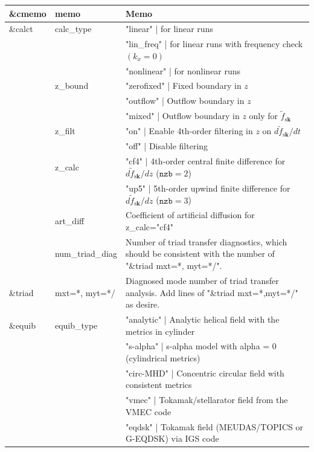 \begin{longtable}{ l | l | p{10cm} }
  \&cmemo & memo & Memo\\
  \hline
  \&calct & calc\_type & "linear" | for linear runs\\
           ~ &             ~ & "lin\_freq" | for linear runs with frequency check $(k_x = 0)$\\
           ~ &             ~ & "nonlinear" | for nonlinear runs\\
             \cline{2-3}
           ~ & z\_bound & "zerofixed" | Fixed boundary in $z$\\
           ~ &            ~ & "outflow" | Outflow boundary in $z$\\
           ~ &            ~ & "mixed" | Outflow boundary in $z$ only for $\tilde{f}_{\mathrm{s}\bm{k}}$\\
             \cline{2-3}
           ~ & z\_filt & "on" | Enable 4th-order filtering in $z$ on $d\tilde{f}_{\mathrm{s}\bm{k}}/dt$\\
           ~ &       ~ & "off" | Disable filtering\\
             \cline{2-3}
           ~ & z\_calc & "cf4" | 4th-order central finite difference for $d\tilde{f}_{\mathrm{s}\bm{k}}/dz$ ($\texttt{nzb}=2$)\\
           ~ &         ~ & "up5" | 5th-order upwind finite difference for $d\tilde{f}_{\mathrm{s}\bm{k}}/dz$ ($\texttt{nzb}=3$)\\
             \cline{2-3}
           ~ & art\_diff & Coefficient of artificial diffusion for z\_calc="cf4"\\
             \cline{2-3}
           ~ & num\_triad\_diag & Number of triad transfer diagnostics, which should be consistent
                                           with the number of "\&triad mxt=*, myt=*/".\\
  \hline
  \&triad & mxt=*, myt=*/ & Diagnosed mode number of triad transfer analysis. Add lines of "\&triad mxt=*,myt=*/" as desire.\\
  \hline
  \&equib & equib\_type & "analytic" | Analytic helical field with the metrics in cylinder\\
           ~ &               ~ & "s-alpha" | s-alpha model with alpha = 0 (cylindrical metrics)\\
           ~ &               ~ & "circ-MHD" | Concentric circular field with consistent metrics\\ 
           ~ &               ~ & "vmec" | Tokamak/stellarator field from the VMEC code\\
           ~ &               ~ & "eqdsk" | Tokamak field (MEUDAS/TOPICS or G-EQDSK) via IGS code\\

\end{longtable}
